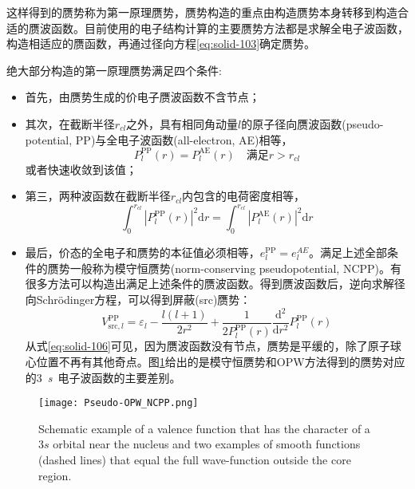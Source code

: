 这样得到的赝势称为第一原理赝势，赝势构造的重点由构造赝势本身转移到构造合适的赝波函数。目前使用的电子结构计算的主要赝势方法都是求解全电子波函数，构造相适应的赝函数，再通过径向方程\eqref{eq:solid-103}确定赝势。

绝大部分构造的第一原理赝势满足四个条件\cite{PRB12-4200_1975,PRB18-5449_1978,PRB19-568_1979,PRB20-4082_1979,PRB26-4199_1982,PRL43-1494_1979,JPC13-L189_1980,PRB32-8412_1985,PRB43-1993_1991}:
\begin{itemize}
	\item 首先，由赝势生成的价电子赝波函数不含节点；
	\item 其次，在截断半径$r_{cl}$之外\cite{JPC13-L189_1980,PRB43-1993_1991}，具有相同角动量$l$的原子径向赝波函数(pseudo-potential, PP)与全电子波函数(all-electron, AE)相等，%
\begin{equation}
	P_l^{\mathrm{PP}}(r)=P_l^{\mathrm{AE}}(r)\quad \mbox{满足}r>r_{cl}
  \label{eq:solid-104}
\end{equation}
或者快速收敛到该值\cite{PRB18-5449_1978,PRL43-1494_1979,PRB32-8412_1985}；
	\item 第三，两种波函数在截断半径$r_{cl}$内包含的电荷密度相等\cite{PRL43-1494_1979,PRB43-1993_1991}，
\begin{equation}
	\int_0^{r_{cl}}|P_l^{\mathrm{PP}}(r)|^2\mathrm{d}r=\int_0^{r_{cl}}|P_l^{\mathrm{AE}}(r)|^2\mathrm{d}r
  \label{eq:solid-105}
\end{equation}
	\item 最后，价态的全电子和赝势的本征值必须相等，$e_l^{\mathrm{PP}}=e_l^{AE}$。满足上述全部条件的赝势一般称为模守恒赝势(norm-conserving pseudopotential, NCPP)\cite{PRL43-1494_1979}。有很多方法可以构造出满足上述条件的赝波函数\cite{PRB18-5449_1978,PRB26-4199_1982,PRL43-1494_1979,JPC13-L189_1980,PRB32-8412_1985,PRB43-1993_1991}。得到赝波函数后，逆向求解径向Schr\"odinger方程，可以得到屏蔽(src)赝势：
\begin{equation}
	V_{\mathrm{src},l}^{\mathrm{PP}}=\varepsilon_l-\frac{l(l+1)}{2r^2}+\frac1{2P_l^{\mathrm{PP}}(r)}\frac{\mathrm{d}^2}{\mathrm{d}r^2}P_l^{\mathrm{PP}}(r)
  \label{eq:solid-106}
\end{equation}
从式\eqref{eq:solid-106}可见，因为赝波函数没有节点，赝势是平缓的，除了原子球心位置不再有其他奇点。图\ref{Pseudo-OPW_NCPP}给出的是模守恒赝势和\textrm{OPW}方法得到的赝势对应的3~\textit{s}~电子波函数的主要差别。
\end{itemize}
\begin{figure}[h!]
\centering
\vspace*{-0.10in}
\texttt{[image: Pseudo-OPW\_NCPP.png]}
\caption{\small \textrm{Schematic example of a valence function that has the character of a $3s$ orbital near the nucleus and two examples of smooth functions (dashed lines) that equal the full wave-function outside the core region.}}%
\label{Pseudo-OPW_NCPP}
\end{figure}
